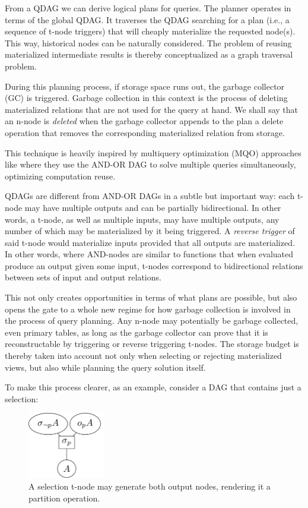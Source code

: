 From a QDAG we can derive logical plans for queries. The
  planner operates in terms of the global QDAG. It traverses the QDAG
  searching for a plan (i.e., a sequence of t-node triggers) that will
  cheaply materialize the requested node(s). This way, historical nodes can be
  naturally considered. The problem of reusing materialized
  intermediate results is thereby conceptualized as a graph traversal
  problem.

During this planning process, if storage space runs out, the
  garbage collector (GC) is triggered. Garbage collection in this
  context is the process of deleting materialized relations that are
  not used for the query at hand. We shall say that an n-node is
  \emph{deleted} when the garbage collector appends to the plan a delete
  operation that removes the corresponding materialized relation
  from storage.

This technique is
heavily inspired by multiquery optimization (MQO) approaches like
\cite{mistryMaterializedViewSelection2001} where they use the AND-OR DAG
to solve multiple queries simultaneously, optimizing computation reuse.

QDAGs are different from AND-OR DAGs in a subtle but important way:
each t-node may have multiple outputs and can be partially
bidirectional. In other words, a t-node, as well as multiple inputs,
may have multiple outputs, any number of which may be materialized by
it being triggered. A \emph{reverse trigger} of said t-node would
materialize inputs provided that all outputs are materialized. In
other words, where AND-nodes are similar to functions that when
evaluated produce an output given some input, t-nodes correspond to
bidirectional relations between sets of input and output
relations.

This not only creates opportunities in terms of what plans
are possible, but also opens the gate to a whole new regime for how
garbage collection is involved in the process of query planning. Any
n-node may potentially be garbage collected, even primary tables, as
long as the garbage collector can prove that it is reconstructable by
triggering or reverse triggering t-nodes. The storage budget is
thereby taken into account not only when selecting or rejecting
materialized views, but also while planning the query solution
itself.

To make this process clearer, as an example, consider a DAG that
contains just a selection:

\begin{figure}[H]
  \centering
  \includegraphics[width=0.3\textwidth]{./imgs/selnet.pdf}
  \caption{A selection t-node may generate both output nodes,
    rendering it a partition operation.}
\end{figure}

